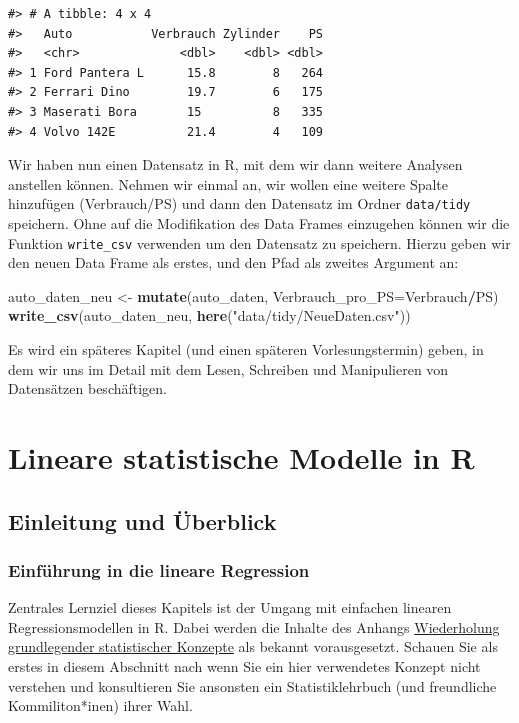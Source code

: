 \documentclass[]{book}
\newenvironment{Shaded}{\begin{snugshade}}{\end{snugshade}}
\newcommand{\KeywordTok}[1]{\textcolor[rgb]{0.13,0.29,0.53}{\textbf{#1}}}
\newcommand{\DataTypeTok}[1]{\textcolor[rgb]{0.13,0.29,0.53}{#1}}
\newcommand{\StringTok}[1]{\textcolor[rgb]{0.31,0.60,0.02}{#1}}
\newcommand{\OperatorTok}[1]{\textcolor[rgb]{0.81,0.36,0.00}{\textbf{#1}}}
\newcommand{\NormalTok}[1]{#1}
\begin{document}
\begin{verbatim}
#> # A tibble: 4 x 4
#>   Auto           Verbrauch Zylinder    PS
#>   <chr>              <dbl>    <dbl> <dbl>
#> 1 Ford Pantera L      15.8        8   264
#> 2 Ferrari Dino        19.7        6   175
#> 3 Maserati Bora       15          8   335
#> 4 Volvo 142E          21.4        4   109
\end{verbatim}

Wir haben nun einen Datensatz in R, mit dem wir dann weitere Analysen
anstellen können. Nehmen wir einmal an, wir wollen eine weitere Spalte
hinzufügen (Verbrauch/PS) und dann den Datensatz im Ordner
\texttt{data/tidy} speichern. Ohne auf die Modifikation des Data Frames
einzugehen können wir die Funktion \texttt{write\_csv} verwenden um den
Datensatz zu speichern. Hierzu geben wir den neuen Data Frame als
erstes, und den Pfad als zweites Argument an:

\begin{Shaded}
\begin{Highlighting}[]
\NormalTok{auto_daten_neu <-}\StringTok{ }\KeywordTok{mutate}\NormalTok{(auto_daten, }\DataTypeTok{Verbrauch_pro_PS=}\NormalTok{Verbrauch}\OperatorTok{/}\NormalTok{PS)}
\KeywordTok{write_csv}\NormalTok{(auto_daten_neu, }\KeywordTok{here}\NormalTok{(}\StringTok{"data/tidy/NeueDaten.csv"}\NormalTok{))}
\end{Highlighting}
\end{Shaded}

Es wird ein späteres Kapitel (und einen späteren Vorlesungstermin)
geben, in dem wir uns im Detail mit dem Lesen, Schreiben und
Manipulieren von Datensätzen beschäftigen.

\chapter{Lineare statistische Modelle in R}\label{linmodel}

\section{Einleitung und Überblick}\label{einleitung-und-uberblick}

\subsection{Einführung in die lineare
Regression}\label{einfuhrung-in-die-lineare-regression}

Zentrales Lernziel dieses Kapitels ist der Umgang mit einfachen linearen
Regressionsmodellen in R. Dabei werden die Inhalte des Anhangs
\protect\hyperlink{stat-rep}{Wiederholung grundlegender statistischer
Konzepte} als bekannt vorausgesetzt. Schauen Sie als erstes in diesem
Abschnitt nach wenn Sie ein hier verwendetes Konzept nicht verstehen und
konsultieren Sie ansonsten ein Statistiklehrbuch (und freundliche
Kommiliton*inen) ihrer Wahl.
\end{document}
